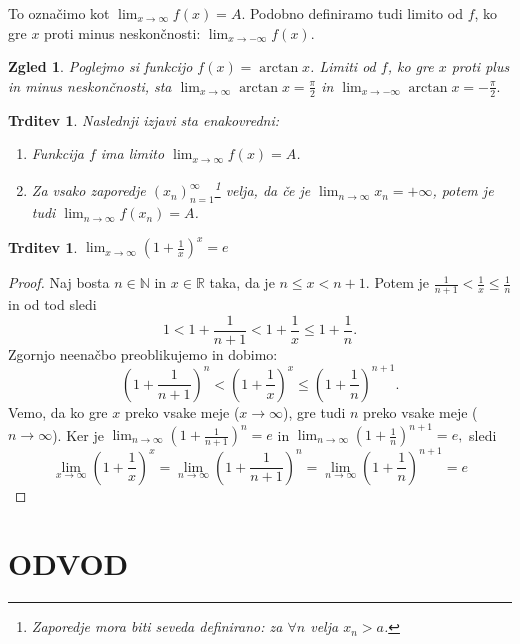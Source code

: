 \documentclass[10pt, a4paper]{article}
\newtheorem{trditev}[izr]{Trditev}
\newtheorem{zgled}[izr]{Zgled}
\newenvironment{noticeC}{%
  \tcolorbox[%
  notitle,
  empty,
  enhanced,  %
  breakable,
  coltext=black, 
  fontupper=\rmfamily,
  noparskip,
  sharp corners,
  boxrule=-1pt,  %
  frame hidden,
  left=7pt,  %
  right=7pt,
  top=5pt,
  bottom=5pt,
  before skip=2.5ex plus 2pt,
  after skip=2.5ex plus 2pt,
  overlay unbroken and last={%
  },
  ]}
{\endtcolorbox}
\newenvironment{dokaz}%
  {\begin{noticeC}\begin{proof}}%
  {\end{proof}\end{noticeC}}
\newcommand{\N}{\mathbb {N}}
\newcommand{\R}{\mathbb {R}}
\newcommand{\zap}[1]{(#1_n)_{n=1} ^{\infty}}
\newcommand{\limzap}[1]{\lim_{n \to \infty} {#1}}
\newcommand{\limf}[3]{\lim_{#1 \to #2} {#3}}
\begin{document}
To označimo kot $\limf{x}{\infty}{f(x)} = A.$ 
Podobno definiramo tudi limito od $f$, ko gre $x$ proti minus neskončnosti: $\limf{x}{-\infty}{f(x)}.$

\begin{zgled}
    Poglejmo si funkcijo $f(x) = \arctan x$. Limiti od $f$, ko gre $x$ proti plus in minus neskončnosti, sta 
    $\limf{x}{\infty}{\arctan x} = \frac{\pi}{2}$ in $\limf{x}{-\infty}{\arctan x} = -\frac{\pi}{2}.$
\end{zgled}

\begin{trditev}
    Naslednji izjavi sta enakovredni:
    \begin{enumerate}
        \item Funkcija $f$ ima limito $\limf{x}{\infty}{f(x)} = A$.
        \item Za vsako zaporedje $\zap{x}$\footnote{Zaporedje mora biti seveda definirano: za $\forall n$ velja $x_n > a$.} velja, da če je
        $\limzap{x_n} = + \infty$, potem je tudi $\limzap{f(x_n)} = A$.
    \end{enumerate}
\end{trditev}

\begin{trditev}
    $\limf{x}{\infty}{\left(1 + \frac{1}{x} \right)^x} = e$
\end{trditev}

\begin{dokaz}
    Naj bosta $n \in \N$ in $x \in \R$ taka, da je $n \leq x < n+1.$ Potem je $\frac{1}{n+1} < \frac{1}{x} \leq \frac{1}{n}$ in od tod sledi $$1 < 1+ \frac{1}{n+1} < 1 + \frac{1}{x} \leq 1 + \frac{1}{n}.$$
    Zgornjo neenačbo preoblikujemo in dobimo: $$\left(1 + \frac{1}{n+1}\right)^n < \left(1 + \frac{1}{x}\right)^x \leq \left(1 + \frac{1}{n} \right)^{n+1}.$$  
    Vemo, da ko gre $x$ preko vsake meje ($x \rightarrow \infty$), gre tudi $n$ preko vsake meje ($n \rightarrow \infty$). Ker je $\limzap{\left(1 + \frac{1}{n+1}\right)^n} = e$ in $\limzap{\left(1 + \frac{1}{n}\right)^{n+1}} = e,$
    sledi $$\limf{x}{\infty}{\left(1 + \frac{1}{x} \right)^x} = \limzap{\left(1 + \frac{1}{n+1}\right)^n} = \limzap{\left(1 + \frac{1}{n}\right)^{n+1}} = e$$
\end{dokaz}

\clearpage
    \section{ODVOD}
\end{document}
